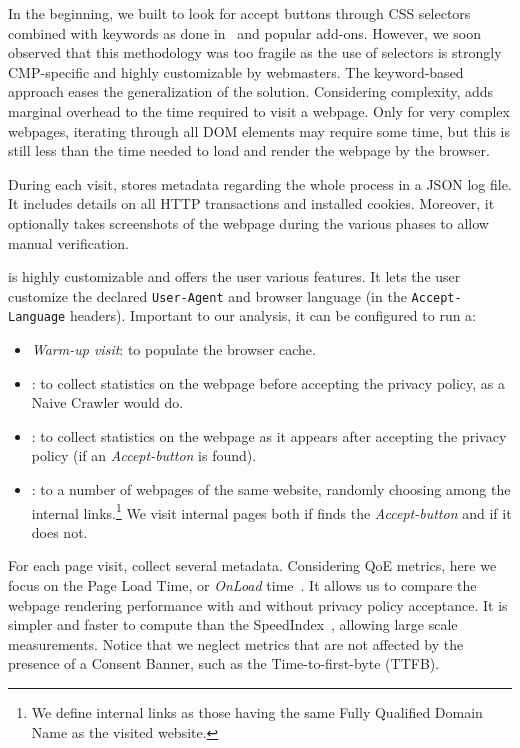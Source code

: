 In the beginning, we built \TOOL to look for accept buttons through CSS selectors combined with keywords as done in~\cite{vallina2019tales} and popular add-ons. However, we soon observed that this methodology was too fragile as the use of selectors is strongly CMP-specific and highly customizable by webmasters. The keyword-based approach eases the generalization of the solution. Considering complexity, \TOOL adds marginal overhead to the time required to visit a webpage. Only for very complex webpages, iterating through all DOM elements may require some time, but this is still less than the time needed to load and render the webpage by the browser. 

During each visit, \TOOL stores metadata regarding the whole process in a JSON log file. It includes details on all HTTP transactions and installed cookies. Moreover, it optionally takes screenshots of the webpage during the various phases to allow manual verification.

\TOOL is highly customizable and offers the user various features. It lets the user customize the declared \texttt{User-Agent} and browser language (in the \texttt{Accept-Language} headers). Important to our analysis, it can be configured to run a:
\begin{itemize}
    \item \emph{Warm-up visit}: to populate the browser cache.
    \item \BEFORE: to collect statistics on the webpage before accepting the privacy policy, as a Naive Crawler would do.
    \item \AFTER: to collect statistics on the webpage as it appears after accepting the privacy policy (if an \emph{Accept-button} is found).
    \item \INTERNAL: to a number of webpages of the same website, randomly choosing among the internal links.\footnote{We define internal links as those having the same Fully Qualified Domain Name as the visited website.} We visit internal pages both if \TOOL finds the \emph{Accept-button} and if it does not.
\end{itemize}

For each page visit, \TOOL collect several metadata. Considering QoE metrics, here we focus on the Page Load Time, or \emph{OnLoad} time~\cite{da2018narrowing}. It allows us to compare the webpage rendering performance with and without privacy policy acceptance. It is simpler and faster to compute than the SpeedIndex~\cite{speedindex}, allowing large scale measurements. Notice that we neglect metrics that are not affected by the presence of a Consent Banner, such as the Time-to-first-byte (TTFB). 

